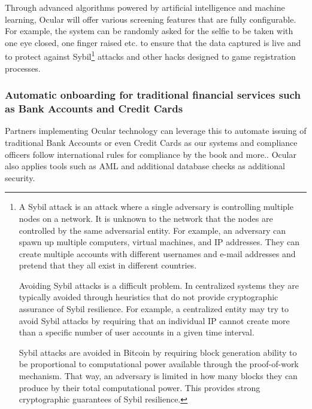 \documentclass[a4paper]{article}
\begin{document}
Through advanced algorithms powered by artificial intelligence and machine learning, Ocular will offer various screening features that are fully configurable. For example, the system can be randomly asked for the selfie to be taken with one eye closed, one finger raised etc. to ensure that the data captured is live and to protect against Sybil\footnote{A Sybil attack is an attack where a single adversary is controlling multiple nodes on a network. It is unknown to the network that the nodes are controlled by the same adversarial entity. For example, an adversary can spawn up multiple computers, virtual machines, and IP addresses. They can create multiple accounts with different usernames and e-mail addresses and pretend that they all exist in different countries.

Avoiding Sybil attacks is a difficult problem. In centralized systems they are typically avoided through heuristics that do not provide cryptographic assurance of Sybil resilience. For example, a centralized entity may try to avoid Sybil attacks by requiring that an individual IP cannot create more than a specific number of user accounts in a given time interval.

Sybil attacks are avoided in Bitcoin by requiring block generation ability to be proportional to computational power available through the proof-of-work mechanism. That way, an adversary is limited in how many blocks they can produce by their total computational power. This provides strong cryptographic guarantees of Sybil resilience.} attacks and other hacks designed to game registration processes. 

\subsubsection*{Automatic onboarding for traditional financial services such as Bank Accounts and Credit Cards}
Partners implementing Ocular technology can leverage this to automate issuing of traditional Bank Accounts or even Credit Cards as our systems and compliance officers follow international rules for compliance by the book and more.. Ocular also applies tools such as AML and additional database checks as additional security.
\end{document}
